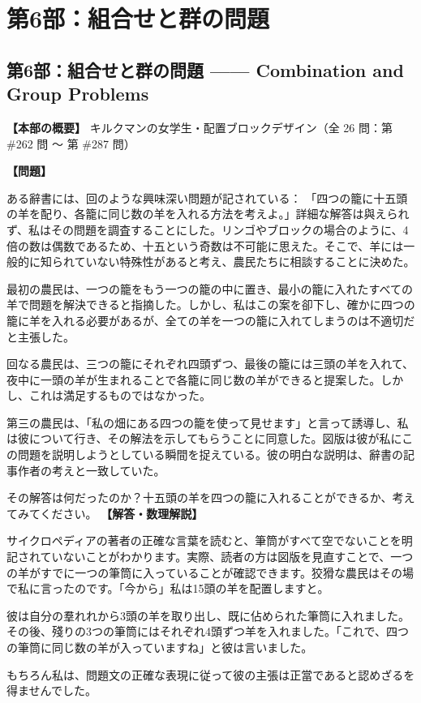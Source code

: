 \documentclass[10pt,a4paper,oneside,openany]{ltjsbook}
\begin{document}
\part{第6部：組合せと群の問題}
\chapter*{第6部：組合せと群の問題 —— Combination and Group Problems}

\textbf{【本部の概要】} キルクマンの女学生・配置ブロックデザイン（全 26 問：第 \#262 問 〜 第 \#287 問）

\vspace{1em}

\begin{tcolorbox}[colback=softblue,colframe=primaryblue,title=\textbf{第 262 問：THOSE FIFTEEN SHEEP.},arc=2mm,boxrule=1pt,breakable]
\textbf{【問題】}\par\vspace{0.3em}
ある辭書には、回のような興味深い問題が記されている：
「四つの籠に十五頭の羊を配り、各籠に同じ数の羊を入れる方法を考えよ。」詳細な解答は與えられず、私はその問題を調査することにした。リンゴやブロックの場合のように、4倍の数は偶数であるため、十五という奇数は不可能に思えた。そこで、羊には一般的に知られていない特殊性があると考え、農民たちに相談することに決めた。

最初の農民は、一つの籠をもう一つの籠の中に置き、最小の籠に入れたすべての羊で問題を解決できると指摘した。しかし、私はこの案を卻下し、確かに四つの籠に羊を入れる必要があるが、全ての羊を一つの籠に入れてしまうのは不適切だと主張した。

回なる農民は、三つの籠にそれぞれ四頭ずつ、最後の籠には三頭の羊を入れて、夜中に一頭の羊が生まれることで各籠に同じ数の羊ができると提案した。しかし、これは満足するものではなかった。

第三の農民は、「私の畑にある四つの籠を使って見せます」と言って誘導し、私は彼について行き、その解法を示してもらうことに同意した。図版は彼が私にこの問題を説明しようとしている瞬間を捉えている。彼の明白な説明は、辭書の記事作者の考えと一致していた。

その解答は何だったのか？十五頭の羊を四つの籠に入れることができるか、考えてみてください。
\tcblower
\textbf{【解答・数理解説】}\par\vspace{0.3em}
サイクロペディアの著者の正確な言葉を読むと、筆筒がすべて空でないことを明記されていないことがわかります。実際、読者の方は図版を見直すことで、一つの羊がすでに一つの筆筒に入っていることが確認できます。狡猾な農民はその場で私に言ったのです。「今から」私は15頭の羊を配置しますと。

彼は自分の羣れれから3頭の羊を取り出し、既に佔められた筆筒に入れました。その後、殘りの3つの筆筒にはそれぞれ4頭ずつ羊を入れました。「これで、四つの筆筒に同じ数の羊が入っていますね」と彼は言いました。

もちろん私は、問題文の正確な表現に従って彼の主張は正當であると認めざるを得ませんでした。
\end{tcolorbox}
\end{document}
